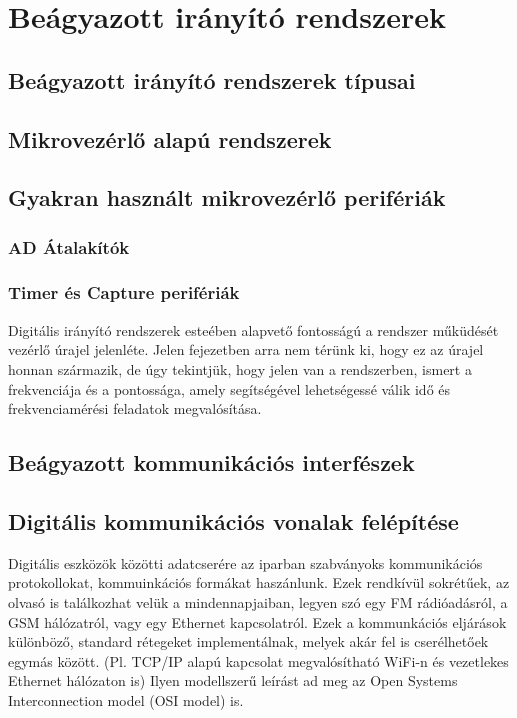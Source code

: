 \section{Beágyazott irányító rendszerek}
\vspace{5cm}
\subsection{Beágyazott irányító rendszerek típusai}

\subsection{Mikrovezérlő alapú rendszerek}

\subsection{Gyakran használt mikrovezérlő perifériák}

\subsubsection{AD Átalakítók}

\subsubsection{Timer és Capture perifériák}
Digitális irányító rendszerek esteében alapvető fontosságú a rendszer műküdését vezérlő úrajel jelenléte. Jelen fejezetben arra nem térünk ki, hogy ez az úrajel honnan származik, de úgy tekintjük, hogy jelen van a rendszerben, ismert a frekvenciája és a pontossága, amely segítségével lehetségessé válik idő és frekvenciamérési feladatok megvalósítása. 

\subsection{Beágyazott kommunikációs interfészek}

\subsection{Digitális kommunikációs vonalak felépítése}

Digitális eszközök közötti adatcserére az iparban szabványoks kommunikációs protokollokat, kommuinkációs formákat haszánlunk. Ezek rendkívül sokrétűek, az olvasó is találkozhat velük a mindennapjaiban, legyen szó egy FM rádióadásról, a GSM hálózatról, vagy egy Ethernet kapcsolatról. Ezek a kommunkációs eljárások különböző, standard rétegeket implementálnak, melyek akár fel is cserélhetőek egymás között. (Pl. TCP/IP alapú kapcsolat megvalósítható WiFi-n és vezetlekes Ethernet hálózaton is) Ilyen modellszerű leírást ad meg az Open Systems Interconnection model (OSI model) is.


